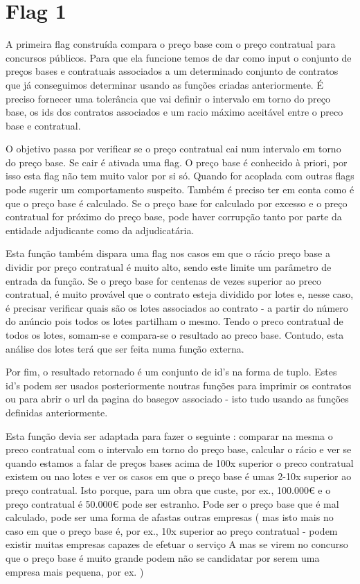 \section{Flag 1}

A primeira flag construída compara o preço base com o preço contratual para concursos públicos. Para que ela funcione temos de dar como input o conjunto de preços bases e contratuais associados a um determinado conjunto de contratos que já conseguimos determinar usando as funções criadas anteriormente. É preciso fornecer uma tolerância que vai definir o intervalo em torno do preço base, os ids dos contratos associados e um racio máximo aceitável entre o preco base e contratual. 


O objetivo passa por verificar se o preço contratual cai num intervalo em torno do preço base. Se cair é ativada uma flag. O preço base é conhecido à priori, por isso esta flag não tem muito valor por si só. Quando for acoplada com outras flags pode sugerir um comportamento suspeito. Também é preciso ter em conta como é que o preço base é calculado. Se o preço base for calculado por excesso e o preço contratual for próximo do preço base, pode haver corrupção tanto por parte da entidade adjudicante como da adjudicatária. 

Esta função também dispara uma flag nos casos em que o rácio preço base a dividir por preço contratual é muito alto, sendo este limite um parâmetro de entrada da função. Se o preço base for centenas de vezes superior ao preco contratual, é muito provável que o contrato esteja dividido por lotes e, nesse caso, é precisar verificar quais são os lotes associados ao contrato - a partir do número do anúncio pois todos os lotes partilham o mesmo. Tendo o preco contratual de todos os lotes, somam-se e compara-se o resultado ao preco base. Contudo, esta análise dos lotes terá que ser feita numa função externa.  

Por fim, o resultado retornado é um conjunto de id's na forma de tuplo. Estes id's podem ser usados posteriormente noutras funções para imprimir os contratos ou para abrir o url da pagina do basegov associado - isto tudo usando as funções definidas anteriormente. 

Esta função devia ser adaptada para fazer o seguinte : comparar na mesma o preco contratual com o intervalo em torno do preço base, calcular o rácio e ver se quando estamos a falar de preços bases acima de 100x superior o preco contratual existem ou nao lotes e ver os casos em que o preço base é umas 2-10x superior ao preço contratual. Isto porque, para um obra que custe, por ex., 100.000€ e o preço contratual é 50.000€ pode ser estranho. Pode ser o preço base que é mal calculado, pode ser uma forma de afastas outras empresas ( mas isto mais no caso em que o preço base é, por ex., 10x superior ao preço contratual - podem existir muitas empresas capazes de efetuar o serviço A mas se virem no concurso que o preço base é muito grande podem não se candidatar por serem uma empresa mais pequena, por ex. )



